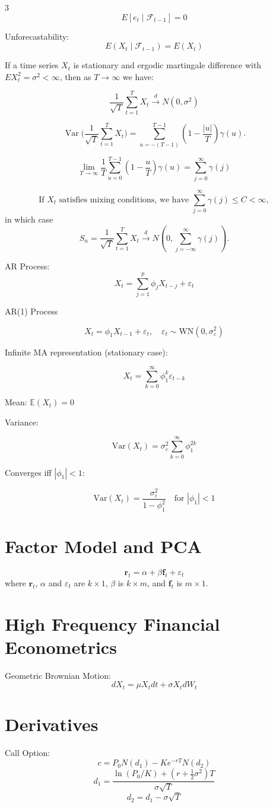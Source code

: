\documentclass[10pt,a4paper]{article}
\begin{document}
\begin{multicols}{3}
\[E[e_t \mid \mathcal{F}_{t-1}] = 0\]

Unforecastability:
\[E(X_t \mid \mathcal{F}_{t-1}) = E(X_t)\]

If a time series $X_t$ is stationary and ergodic martingale difference with $E X_t^2 = \sigma^2 < \infty$, then as $T \to \infty$ we have:

\begin{equation}
    \frac{1}{\sqrt{T}} \sum_{t=1}^{T} X_t \xrightarrow{d} N(0, \sigma^2)
\end{equation}

\[
\operatorname{Var}\Bigg(\frac{1}{\sqrt{T}} \sum_{t=1}^{T} X_t \Bigg) 
= \sum_{u=-(T-1)}^{T-1} \left( 1 - \frac{|u|}{T} \right) \gamma(u).
\]

\[
\lim_{T\to\infty} \frac{1}{T} \sum_{u=0}^{T-1} \left(1 - \frac{u}{T}\right) \gamma(u) = \sum_{j=0}^{\infty} \gamma(j)
\]

\[
\text{If } X_t \text{ satisfies mixing conditions, we have }
\sum_{j=0}^{\infty} \gamma(j) \leq C < \infty,
\]
in which case
\[
S_n = \frac{1}{\sqrt{T}} \sum_{t=1}^{T} X_t \xrightarrow{d} N\left(0, \sum_{j=-\infty}^{\infty} \gamma(j)\right).
\]

AR Process:
\[
X_t = \sum_{j=1}^{p} \phi_j X_{t-j} + \varepsilon_t
\]

AR(1) Process

\[
X_t = \phi_1 X_{t-1} + \varepsilon_t, \quad \varepsilon_t \sim \mathrm{WN}(0,\sigma_\varepsilon^2)
\]

Infinite MA representation (stationary case):

\[
X_t = \sum_{k=0}^{\infty} \phi_1^k \varepsilon_{t-k}
\]

Mean: \(\mathbb{E}(X_t) = 0\)

Variance:

\[
\mathrm{Var}(X_t) = \sigma_\varepsilon^2 \sum_{k=0}^{\infty} \phi_1^{2k}
\]

Converges iff \(|\phi_1| < 1\):

\[
\mathrm{Var}(X_t) = \frac{\sigma_\varepsilon^2}{1 - \phi_1^2} \quad \text{for } |\phi_1| < 1
\]



\section*{Factor Model and PCA}
\[
\mathbf{r}_t = \alpha + \beta \mathbf{f}_t + \varepsilon_t
\]
where $\mathbf{r}_t$, $\alpha$ and $\varepsilon_t$ are $k \times 1$, $\beta$ is $k \times m$, and $\mathbf{f}_t$ is $m \times 1$.
\section*{High Frequency Financial Econometrics}
Geometric Brownian Motion:
\[dX_t = \mu X_t dt + \sigma X_t dW_t\]


\section*{Derivatives}
Call Option:
\[ c = P_0 N(d_1) - K e^{-rT} N(d_2) \]
\[d_1 = \frac{\ln(P_0 / K) + (r + \frac{1}{2}\sigma^2)T}{\sigma \sqrt{T}}\]
\[d_2 = d_1 - \sigma \sqrt{T}\]
\end{multicols}
\end{document}

